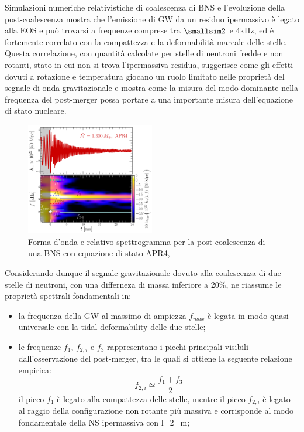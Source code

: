 Simulazioni numeriche relativistiche di coalescenza di BNS e l'evoluzione della post-coalescenza mostra che l'emissione di GW da un residuo ipermassivo è legato alla EOS e può trovarsi a frequenze comprese tra $\smallsim2$ e 4kHz, ed è fortemente correlato con la compattezza e la deformabilità mareale delle stelle. Questa correlazione, con quantità calcolate per stelle di neutroni fredde e non rotanti, stato in cui non si trova l'ipermassiva residua, suggerisce come gli effetti dovuti a rotazione e temperatura giocano un ruolo limitato nelle proprietà del segnale di onda gravitazionale e mostra come la misura del modo dominante nella frequenza del post-merger possa portare a una importante misura dell'equazione di stato nucleare\cite{sarin2020evolution}.

\begin{figure}
	\vspace{-15pt}
	\begin{center}
		\includegraphics[width=0.5\textwidth]{figures/Capitolo_1/GW_spectrogram_APR4-q10-M1300.pdf}
	\end{center}
	\vspace{-10pt}
	\caption{Forma d'onda e relativo spettrogramma per la post-coalescenza di una BNS con equazione di stato APR4, \cite{Rezzolla_2016}}
	\label{fig:spettrogramma_postmerger_APR4}
	\vspace{-30pt}
\end{figure}
Considerando dunque il segnale gravitazionale dovuto alla coalescenza di due stelle di neutroni, con una differneza di massa inferiore a 20\%, \cite{Rezzolla_2016} ne riassume le proprietà spettrali fondamentali in:
\begin{itemize}
	\item la frequenza della GW al massimo di ampiezza $f_{max}$ è legata in modo quasi-universale con la tidal deformability delle due stelle;
	\item le frequenze $f_1$, $f_{2,i}$ e $f_3$ rappresentano i picchi principali visibili dall'osservazione del post-merger, tra le quali si ottiene la seguente relazione empirica:
	\begin{equation}
	f_{2,i}\simeq\frac{f_1 + f_3}{2} 
	\label{eqn:f1_2_3}
	\end{equation} 
	il picco $f_1$ è legato alla compattezza delle stelle, mentre il picco $f_{2,i}$ è legato al raggio della configurazione non rotante più massiva e corrisponde al modo fondamentale della NS ipermassiva con l=2=m;
\end{itemize}


